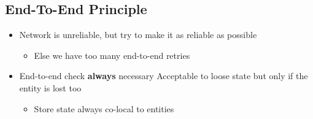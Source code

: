 \subsection{End-To-End Principle}
\begin{itemize}
    \item Network is unreliable, but try to make it as reliable as possible
        \begin{itemize}
            \item Else we have too many end-to-end retries
        \end{itemize}
    \item End-to-end check \textbf{always} necessary
     Acceptable to loose state but only if the entity is lost too
        \begin{itemize}
            \item Store state always co-local to entities
        \end{itemize}
\end{itemize}

